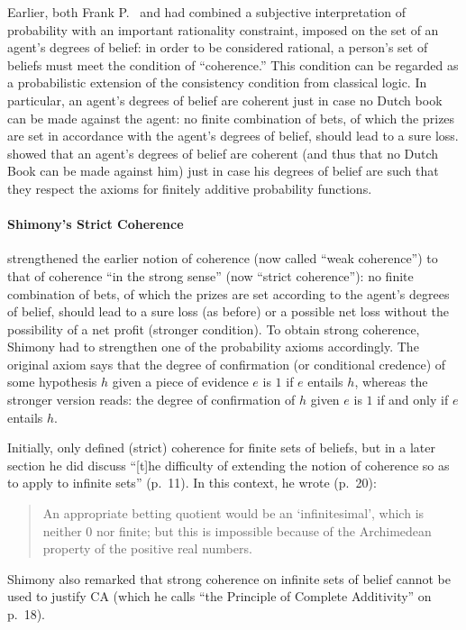 Earlier, both Frank P.~\citet{Ramsey:1926} and \citet{deFinetti:1937} had combined a subjective interpretation of probability with an important rationality constraint, imposed on the set of an agent's degrees of belief: in order to be considered rational, a person's set of beliefs must meet the condition of ``coherence.'' This condition can be regarded as a probabilistic extension of the consistency condition from classical logic.
In particular, an agent's degrees of belief are coherent just in case no Dutch book can be made against the agent: no finite combination of bets, of which the prizes are set in accordance with the agent's degrees of belief, should lead to a sure loss.  showed that an agent's degrees of belief are coherent (and thus that no Dutch Book can be made against him) just in case his degrees of belief are such that they respect the axioms for finitely additive probability functions.

\paragraph{Shimony's Strict Coherence}
\citet{Shimony:1955} strengthened the earlier notion of coherence (now called ``weak coherence'') to that of coherence ``in the strong sense'' (now ``strict coherence''): no finite combination of bets, of which the prizes are set according to the agent's degrees of belief, should lead to a sure loss (as before) or a possible net loss without the possibility of a net profit (stronger condition).
To obtain strong coherence, Shimony had to strengthen one of the probability axioms accordingly.
The original axiom says that the degree of confirmation (or conditional credence) of some hypothesis $h$ given a piece of evidence $e$ is $1$ if $e$ entails $h$, whereas the stronger version reads: the degree of confirmation of $h$ given $e$ is $1$ if and only if $e$ entails $h$.

Initially, \citet{Shimony:1955} only defined (strict) coherence for finite sets of beliefs, but in a later section he did discuss ``[t]he difficulty of extending the notion of coherence so as to apply to infinite sets'' (p.~11).
In this context, he wrote (p.~20):
\begin{quote}
An appropriate betting quotient would be an `infinitesimal', which is neither $0$ nor finite; but this is impossible because of the Archimedean property of the positive real numbers.
\end{quote}
Shimony also remarked that strong coherence on infinite sets of belief cannot be used to justify CA (which he calls ``the Principle of Complete Additivity'' on p.~18).

